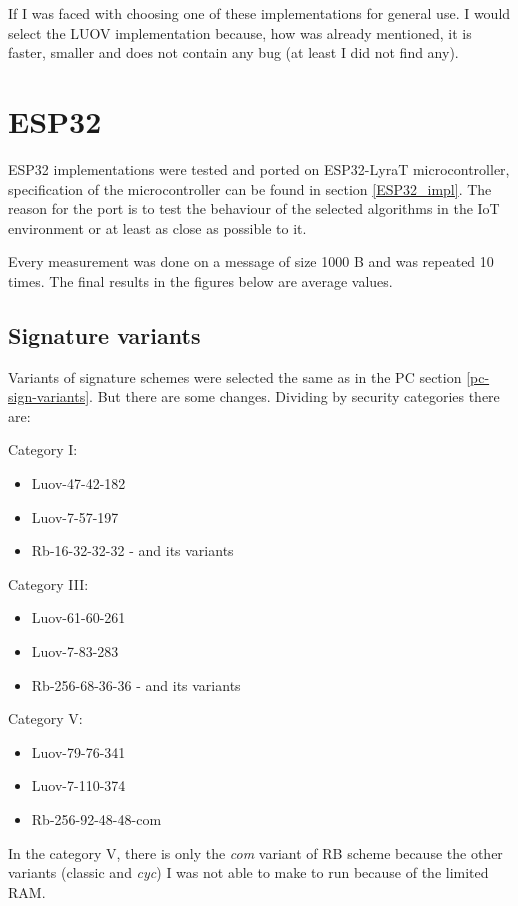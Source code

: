 \documentclass[thesis=M,english]{FITthesis}[2019/12/23]
\begin{document}
\bigskip
\noindent
If I was faced with choosing one of these implementations for general use. I would select the LUOV implementation because, how was already mentioned, it is faster, smaller and does not contain any bug (at least I did not find any).

\newpage
\section{ESP32}
ESP32 implementations were tested and ported on ESP32-LyraT microcontroller, specification of the microcontroller can be found in section \ref{ESP32_impl}. The reason for the port is to test the behaviour of the selected algorithms in the IoT environment or at least as close as possible to it.

\bigskip
\noindent
Every measurement was done on a message of size 1000 B and was repeated 10 times. The final results in the figures below are average values.

\subsection{Signature variants}
Variants of signature schemes were selected the same as in the PC section \ref{pc-sign-variants}. But there are some changes. Dividing by security categories there are:

\bigskip
\noindent
Category I:
\begin{itemize}
\item Luov-47-42-182
\item Luov-7-57-197
\item Rb-16-32-32-32 - and its variants
\end{itemize}

\noindent
Category III:
\begin{itemize}
\item Luov-61-60-261
\item Luov-7-83-283
\item Rb-256-68-36-36 - and its variants
\end{itemize}

\noindent
Category V:
\begin{itemize}
\item Luov-79-76-341
\item Luov-7-110-374
\item Rb-256-92-48-48-com
\end{itemize}

\noindent
In the category V, there is only the \textit{com} variant of RB scheme because the other variants (classic and \textit{cyc}) I was not able to make to run because of the limited RAM.
\end{document}
